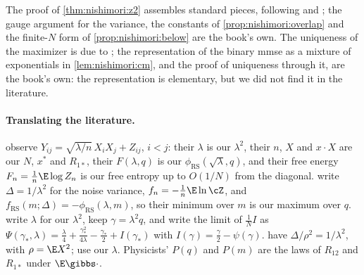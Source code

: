 \begin{refsection}
The proof of \cref{thm:nishimori:z2} assembles standard pieces, following \textcite{BarbierMacris2019} and \textcite{BarbierEtAl2019}; the gauge argument for the variance, the constants of \cref{prop:nishimori:overlap} and the finite-$N$ form of \cref{prop:nishimori:below} are the book's own. The uniqueness of the maximizer is due to \textcite{DeshpandeAbbeMontanari2016}; the representation of the binary mmse as a mixture of exponentials in \cref{lem:nishimori:cm}, and the proof of uniqueness through it, are the book's own: the representation is elementary, but we did not find it in the literature.

\paragraph{Translating the literature.} \Textcite{LelargeMiolane2019} observe $Y_{ij}=\sqrt{\lambda/n}\,X_iX_j+Z_{ij}$, $i<j$: their $\lambda$ is our $\lambda^2$, their $n$, $X$ and $x\cdot X$ are our $N$, $x^*$ and $R_{1*}$, their $F(\lambda,q)$ is our $\phi_{\mathrm{RS}}(\sqrt\lambda,q)$, and their free energy $F_n=\frac1n\E\log Z_n$ is our free entropy up to $O(1/N)$ from the diagonal. \Textcite{BarbierMacris2019} write $\Delta=1/\lambda^2$ for the noise variance, $f_n=-\frac1n\E\ln\cZ$, and $f_{\mathrm{RS}}(m;\Delta)=-\phi_{\mathrm{RS}}(\lambda,m)$, so their minimum over $m$ is our maximum over $q$. \Textcite{DeshpandeAbbeMontanari2016} write $\lambda$ for our $\lambda^2$, keep $\gamma=\lambda^2q$, and write the limit of $\frac1NI$ as $\Psi(\gamma_*,\lambda)=\frac\lambda4+\frac{\gamma_*^2}{4\lambda}-\frac{\gamma_*}2+I(\gamma_*)$ with $I(\gamma)=\frac\gamma2-\psi(\gamma)$. \Textcite{LesieurKrzakalaZdeborova2017} have $\Delta/\rho^2=1/\lambda^2$, with $\rho=\E X^2$; \textcite{MontanariVenkataramanan2021} use our $\lambda$. Physicists' $P(q)$ and $P(m)$ are the laws of $R_{12}$ and $R_{1*}$ under $\E\gibbs\cdot$.

\printchapterbib
\end{refsection}
